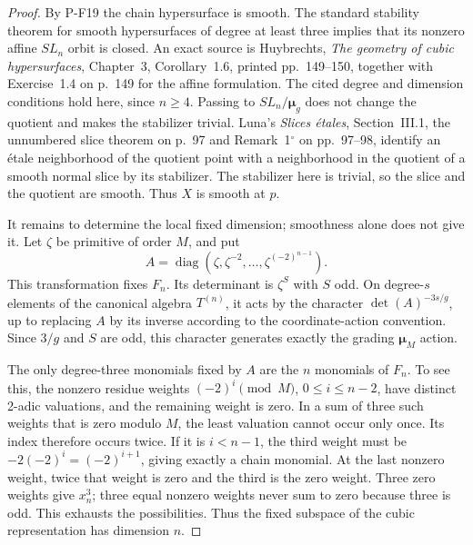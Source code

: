 \documentclass[11pt,a4paper]{article}
\begin{document}
\begin{proof}
By P-F19 the chain hypersurface is smooth. The standard
stability theorem for smooth hypersurfaces of degree at
least three implies that its nonzero affine $SL_n$ orbit
is closed. An exact source is Huybrechts, \emph{The geometry
of cubic hypersurfaces}, Chapter~3, Corollary~1.6, printed
pp.~149--150, together with Exercise~1.4 on p.~149 for the
affine formulation. The cited degree and dimension conditions
hold here, since $n\ge4$. Passing to $SL_n/\boldsymbol\mu_g$
does not change the quotient and makes the stabilizer trivial.
Luna's \emph{Slices \'etales}, Section~III.1, the unnumbered
slice theorem on p.~97 and Remark~1$^\circ$ on pp.~97--98, identify an
\'etale neighborhood of the quotient point with a neighborhood
in the quotient of a smooth normal slice by its stabilizer.
The stabilizer here is trivial, so the slice and the quotient
are smooth. Thus $X$ is smooth at $p$.

It remains to determine the local fixed dimension; smoothness
alone does not give it. Let $\zeta$ be primitive of order $M$,
and put
\[
 A=\operatorname{diag}
       (\zeta,\zeta^{-2},\ldots,\zeta^{(-2)^{n-1}}).
\]
This transformation fixes $F_n$. Its determinant is
$\zeta^S$ with $S$ odd. On degree-$s$ elements of the
canonical algebra $T^{(n)}$, it acts by the character
$\det(A)^{-3s/g}$, up to replacing $A$ by its inverse
according to the coordinate-action convention. Since
$3/g$ and $S$ are odd, this character generates exactly
the grading $\boldsymbol\mu_M$ action.

The only degree-three monomials fixed by $A$ are the $n$
monomials of $F_n$. To see this, the nonzero residue weights
$(-2)^i\pmod M$, $0\le i\le n-2$, have distinct
2-adic valuations, and the remaining weight is zero.
In a sum of three such weights that is zero modulo $M$,
the least valuation cannot occur only once. Its index
therefore occurs twice. If it is $i<n-1$, the third
weight must be $-2(-2)^i=(-2)^{i+1}$, giving exactly
a chain monomial. At the last nonzero weight, twice that
weight is zero and the third is the zero weight. Three
zero weights give $x_n^3$; three equal nonzero weights
never sum to zero because three is odd. This exhausts
the possibilities. Thus the fixed subspace of the cubic
representation has dimension $n$.


\end{proof}
\end{document}
